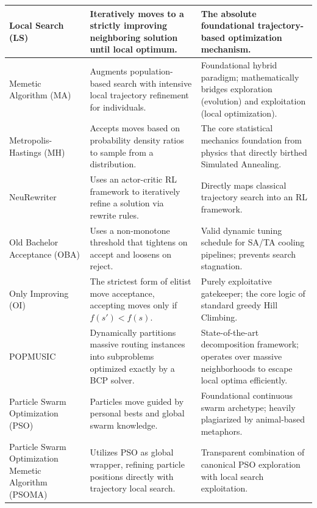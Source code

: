 \begin{center}
\begin{longtable}{
  >{\raggedright\arraybackslash}p{}
  >{\raggedright\arraybackslash}p{}
  >{\raggedright\arraybackslash}p{}
}
Local Search (LS) & Iteratively moves to a strictly improving neighboring solution until local optimum. & The absolute foundational trajectory-based optimization mechanism. \\ \midrule

Memetic Algorithm (MA) & Augments population-based search with intensive local trajectory refinement for individuals. & Foundational hybrid paradigm; mathematically bridges exploration (evolution) and exploitation (local optimization). \\ \midrule

Metropolis-Hastings (MH) & Accepts moves based on probability density ratios to sample from a distribution. & The core statistical mechanics foundation from physics that directly birthed Simulated Annealing. \\ \midrule

NeuRewriter & Uses an actor-critic RL framework to iteratively refine a solution via rewrite rules. & Directly maps classical trajectory search into an RL framework. \\ \midrule

Old Bachelor Acceptance (OBA) & Uses a non-monotone threshold that tightens on accept and loosens on reject. & Valid dynamic tuning schedule for SA/TA cooling pipelines; prevents search stagnation. \\ \midrule

Only Improving (OI) & The strictest form of elitist move acceptance, accepting moves only if $f(s') < f(s)$. & Purely exploitative gatekeeper; the core logic of standard greedy Hill Climbing. \\ \midrule

POPMUSIC & Dynamically partitions massive routing instances into subproblems optimized exactly by a BCP solver. & State-of-the-art decomposition framework; operates over massive neighborhoods to escape local optima efficiently. \\ \midrule

Particle Swarm Optimization (PSO) & Particles move guided by personal bests and global swarm knowledge. & Foundational continuous swarm archetype; heavily plagiarized by animal-based metaphors. \\ \midrule

Particle Swarm Optimization Memetic Algorithm (PSOMA) & Utilizes PSO as global wrapper, refining particle positions directly with trajectory local search. & Transparent combination of canonical PSO exploration with local search exploitation. \\ \midrule


\end{longtable}
\end{center}
